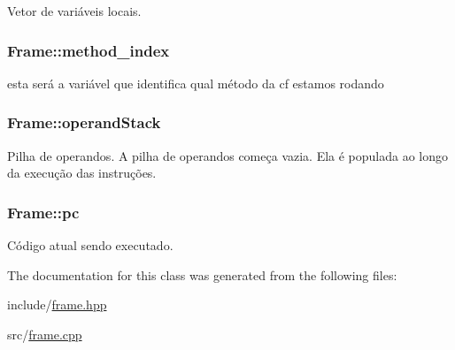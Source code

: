 Vetor de variáveis locais. 

\hypertarget{classFrame_a9a7eb96be80ac389517368b48f88e1f5}{
\subsubsection[{method\+\_\+index}]{\setlength{\rightskip}{0pt plus 5cm}Frame\+::method\+\_\+index}}\label{classFrame_a9a7eb96be80ac389517368b48f88e1f5}


esta será a variável que identifica qual método da cf estamos rodando 

\hypertarget{classFrame_ad8d3859aa247f9ea26ed70734dd93141}{
\subsubsection[{operand\+Stack}]{\setlength{\rightskip}{0pt plus 5cm}Frame\+::operand\+Stack}}\label{classFrame_ad8d3859aa247f9ea26ed70734dd93141}


Pilha de operandos. A pilha de operandos começa vazia. Ela é populada ao longo da execução das instruções. 

\hypertarget{classFrame_a65edf2210e6653b9acbdc58240040104}{
\subsubsection[{pc}]{\setlength{\rightskip}{0pt plus 5cm}Frame\+::pc}}\label{classFrame_a65edf2210e6653b9acbdc58240040104}


Código atual sendo executado. 



The documentation for this class was generated from the following files\+:\begin{DoxyCompactItemize}
\item 
include/\hyperlink{frame_8hpp}{frame.\+hpp}\item 
src/\hyperlink{frame_8cpp}{frame.\+cpp}\end{DoxyCompactItemize}
